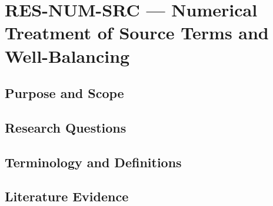 
\section{RES-NUM-SRC --- Numerical Treatment of Source Terms and Well-Balancing}
\label{sec:res-num-src}

\subsection{Purpose and Scope}
\label{sec:res-num-src-purpose}


\subsection{Research Questions}
\label{sec:res-num-src-research-questions}


\subsection{Terminology and Definitions}
\label{sec:res-num-src-definitions}


\subsection{Literature Evidence}
\label{sec:res-num-src-literature-evidence}

%

